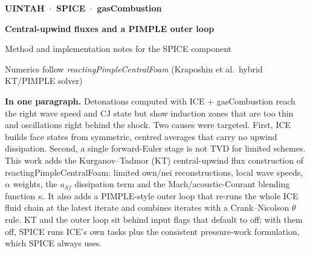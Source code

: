 \documentclass[11pt]{article}
\begin{document}
\thispagestyle{empty}
\vspace*{-6mm}
\begingroup\color{white}\sffamily\raggedright
  {\small\bfseries UINTAH \,$\cdot$\, SPICE \,$\cdot$\, gasCombustion\par}
  \vspace{5mm}
  {\LARGE\bfseries Central-upwind fluxes and a PIMPLE outer loop\par}
  \vspace{3mm}
  {\large Method and implementation notes for the SPICE component\par}
  \vspace{2mm}
  {\small Numerics follow \emph{reactingPimpleCentralFoam} (Kraposhin et al.\ hybrid KT/PIMPLE solver)\par}
\endgroup
\vspace{20mm}

\begin{keypoint}
\textbf{\sffamily\color{Ink}In one paragraph.}
Detonations computed with ICE + gasCombustion reach the right wave speed and CJ state but
show induction zones that are too thin and oscillations right behind the shock. Two
causes were targeted. First, ICE builds face states from symmetric, centred averages that
carry no upwind dissipation. Second, a single forward-Euler stage is not TVD for limited
schemes. This work adds the Kurganov--Tadmor (KT) central-upwind flux construction of
reactingPimpleCentralFoam: limited own/nei reconstructions, local wave speeds, $\alpha$
weights, the $a_{Sf}$ dissipation term and the Mach/acoustic-Courant blending function
$\kappa$. It also adds a PIMPLE-style outer loop that re-runs the whole ICE fluid chain at
the latest iterate and combines iterates with a Crank--Nicolson $\theta$ rule. KT and the outer loop sit behind input flags that default to off; with them
off, SPICE runs ICE's own tasks plus the consistent pressure-work formulation, which SPICE
always uses.
\end{keypoint}

\tableofcontents
\newpage
\end{document}
